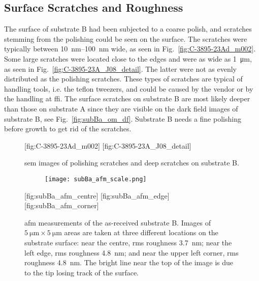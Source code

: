\subsection{Surface Scratches and Roughness}
The surface of substrate B had been subjected to a coarse polish, and scratches stemming from the polishing could be seen on the surface. The scratches were typically between \SIrange{10}{100}{\nano\metre} wide, as seen in Fig.~\ref{fig:C-3895-23Ad_m002}. Some large scratches were located close to the edges and were as wide as \SI{1}{\micro\metre}, as seen in Fig.~\ref{fig:C-3895-23A_J08_detail}. The latter were not as evenly distributed as the polishing scratches. These types of scratches are typical of handling tools, i.e. the teflon tweezers, and could be caused by the vendor or by the handling at \ac{ffi}. The surface scratches on substrate B are most likely deeper than those on substrate A since they are visible on the dark field images of substrate B, see Fig.~\ref{fig:subBa_om_df}. Substrate B needs a fine polishing before growth to get rid of the scratches.
\begin{figure}[htbp]
    \centering
    [fig:C-3895-23Ad_m002]
    [fig:C-3895-23A_J08_detail]
    \caption[\Ac{sem} images of scratches on substrate B.]{\Ac{sem} images of  polishing scratches and  deep scratches on substrate B.}
    \label{fig:SEM_C389523_scratches}
\end{figure}

\begin{figure}[htbp]
    \centering
    \begin{subfigure}[c]{0.032\linewidth}
        \label{fig:subBa_afm_scale}\captionsetup{list=no}
        \texttt{[image: subBa\_afm\_scale.png]}
    \end{subfigure}
    \hfill
    [fig:subBa_afm_centre]
    \hfill
    [fig:subBa_afm_edge]
    \hfill
    [fig:subBa_afm_corner]
    \caption[\Ac{afm} of as-received substrate B.]{\Ac{afm} measurements of the as-received substrate B. Images of $\SI{5}{\micro\metre}\times\SI{5}{\micro\metre}$ areas are taken at three different locations on the substrate surface:  near the centre, \ac{rms} roughness \SI{3,7}{\nano\metre};  near the left edge, \ac{rms} roughness \SI{4,8}{\nano\metre}; and  near the upper left corner, \ac{rms} roughness \SI{4,8}{\nano\metre}. The bright line near the top of the image is due to the tip losing track of the surface.}\label{fig:subBa_afm}
\end{figure} %

